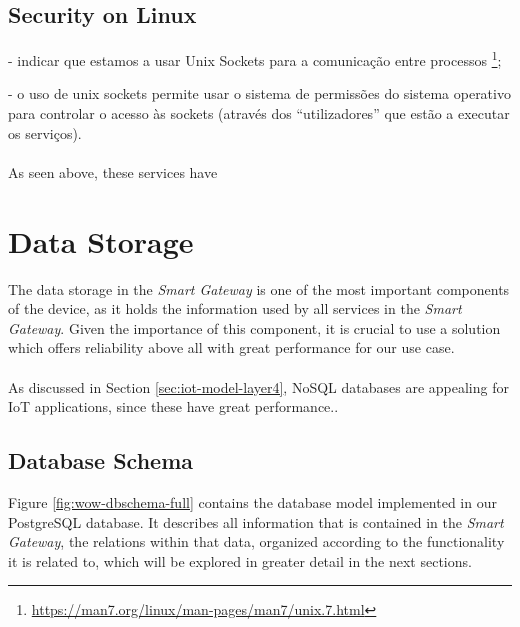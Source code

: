 \paragraph{} 

\subsection{Security on Linux}
- indicar que estamos a usar Unix Sockets para a comunicação entre processos \footnote{\url{https://man7.org/linux/man-pages/man7/unix.7.html}}; 

- o uso de unix sockets permite usar o sistema de permissões do sistema operativo para controlar o acesso às sockets (através dos ``utilizadores'' que estão a executar os serviços).

\paragraph{} As seen above, these services have 

\section{Data Storage}

The data storage in the \textit{Smart Gateway} is one of the most important components of the device, as it holds the information used by all services in the \textit{Smart Gateway}. Given the importance of this component, it is crucial to use a solution which offers reliability above all with great performance for our use case.  

\paragraph{} As discussed in Section \ref{sec:iot-model-layer4}, No\acs{SQL} databases are appealing for \acs{IoT} applications, since these have great performance..



\subsection{Database Schema}
Figure \ref{fig:wow-dbschema-full} contains the database model implemented in our PostgreSQL database. It describes all information that is contained in the \textit{Smart Gateway}, the relations within that data, organized according to the functionality it is related to, which will be explored in greater detail in the next sections.

